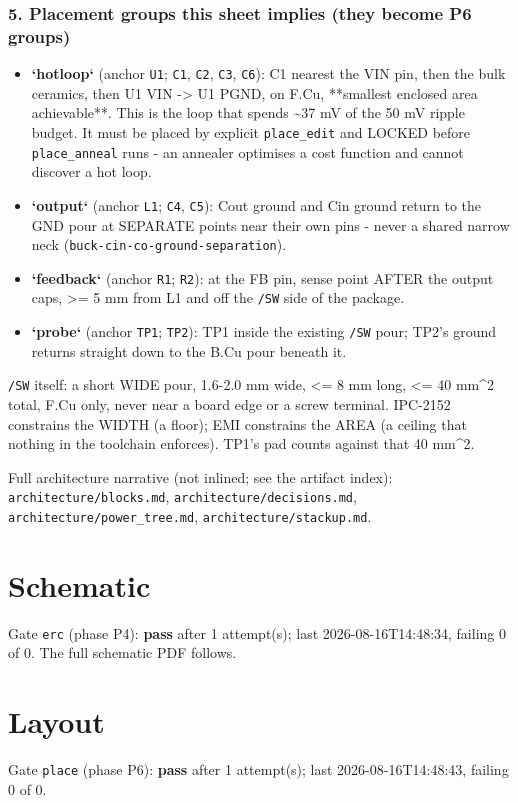 \documentclass[11pt,a4paper]{article}
\begin{document}
\subsubsection*{5. Placement groups this sheet implies (they become P6 groups)}
\begin{itemize}
\item \textbf{`hotloop`} (anchor \texttt{U1}; \texttt{C1}, \texttt{C2}, \texttt{C3}, \texttt{C6}): C1 nearest the VIN
pin, then the bulk ceramics, then U1 VIN -\textgreater{} U1 PGND, on F.Cu, {*}{*}smallest
enclosed area achievable{*}{*}. This is the loop that spends \textasciitilde{}37 mV of the
50 mV ripple budget. It must be placed by explicit \texttt{place\_edit} and LOCKED
before \texttt{place\_anneal} runs - an annealer optimises a cost function and
cannot discover a hot loop.
\item \textbf{`output`} (anchor \texttt{L1}; \texttt{C4}, \texttt{C5}): Cout ground and Cin ground return
to the GND pour at SEPARATE points near their own pins - never a shared
narrow neck (\texttt{buck-cin-co-ground-separation}).
\item \textbf{`feedback`} (anchor \texttt{R1}; \texttt{R2}): at the FB pin, sense point AFTER the
output caps, \textgreater{}= 5 mm from L1 and off the \texttt{/SW} side of the package.
\item \textbf{`probe`} (anchor \texttt{TP1}; \texttt{TP2}): TP1 inside the existing \texttt{/SW} pour;
TP2's ground returns straight down to the B.Cu pour beneath it.
\end{itemize}
\texttt{/SW} itself: a short WIDE pour, 1.6-2.0 mm wide, \textless{}= 8 mm long, \textless{}= 40 mm\textasciicircum{}2 total, F.Cu only, never near a board edge or a screw terminal. IPC-2152 constrains the WIDTH (a floor); EMI constrains the AREA (a ceiling that nothing in the toolchain enforces). TP1's pad counts against that 40 mm\textasciicircum{}2.

Full architecture narrative (not inlined; see the artifact index): \texttt{architecture/blocks.md}, \texttt{architecture/decisions.md}, \texttt{architecture/power\_tree.md}, \texttt{architecture/stackup.md}.
\section{Schematic}
Gate \texttt{erc} (phase P4): \textbf{pass} after 1 attempt(s); last 2026-08-16T14:48:34, failing 0 of 0.
The full schematic PDF follows.

\section{Layout}
Gate \texttt{place} (phase P6): \textbf{pass} after 1 attempt(s); last 2026-08-16T14:48:43, failing 0 of 0.
\end{document}
